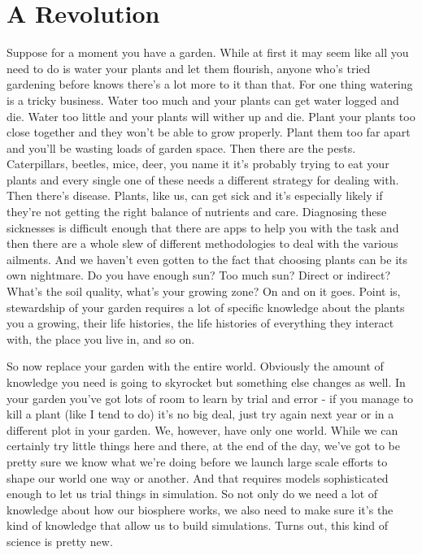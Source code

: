 \documentclass[11pt,a5paper]{book}
\begin{document}
\section{A Revolution}
Suppose for a moment you have a garden. While at first it may seem like all you need to do is water your plants and let them flourish, anyone who's tried gardening before knows there's a lot more to it than that. For one thing watering is a tricky business. Water too much and your plants can get water logged and die. Water too little and your plants will wither up and die. Plant your plants too close together and they won't be able to grow properly. Plant them too far apart and you'll be wasting loads of garden space. Then there are the pests. Caterpillars, beetles, mice, deer, you name it it's probably trying to eat your plants and every single one of these needs a different strategy for dealing with. Then there's disease. Plants, like us, can get sick and it's especially likely if they're not getting the right balance of nutrients and care. Diagnosing these sicknesses is difficult enough that there are apps to help you with the task and then there are a whole slew of different methodologies to deal with the various ailments. And we haven't even gotten to the fact that choosing plants can be its own nightmare. Do you have enough sun? Too much sun? Direct or indirect? What's the soil quality, what's your growing zone? On and on it goes. Point is, stewardship of your garden requires a lot of specific knowledge about the plants you a growing, their life histories, the life histories of everything they interact with, the place you live in, and so on. 

So now replace your garden with the entire world. Obviously the amount of knowledge you need is going to skyrocket but something else changes as well. In your garden you've got lots of room to learn by trial and error - if you manage to kill a plant (like I tend to do) it's no big deal, just try again next year or in a different plot in your garden. We, however, have only one world. While we can certainly try little things here and there, at the end of the day, we've got to be pretty sure we know what we're doing before we launch large scale efforts to shape our world one way or another. And that requires models sophisticated enough to let us trial things in simulation. So not only do we need a lot of knowledge about how our biosphere works, we also need to make sure it's the kind of knowledge that allow us to build simulations. Turns out, this kind of science is pretty new. 
\newline
\end{document}
